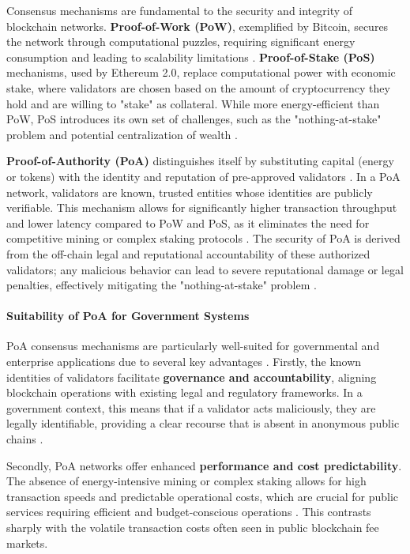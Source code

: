 Consensus mechanisms are fundamental to the security and integrity of blockchain networks. \textbf{Proof-of-Work (PoW)}, exemplified by Bitcoin, secures the network through computational puzzles, requiring significant energy consumption and leading to scalability limitations \cite{researchgate2020survey}. \textbf{Proof-of-Stake (PoS)} mechanisms, used by Ethereum 2.0, replace computational power with economic stake, where validators are chosen based on the amount of cryptocurrency they hold and are willing to "stake" as collateral. While more energy-efficient than PoW, PoS introduces its own set of challenges, such as the "nothing-at-stake" problem and potential centralization of wealth \cite{researchgate2020survey}.

\textbf{Proof-of-Authority (PoA)} distinguishes itself by substituting capital (energy or tokens) with the identity and reputation of pre-approved validators \cite{zebpay2026poa}. In a PoA network, validators are known, trusted entities whose identities are publicly verifiable. This mechanism allows for significantly higher transaction throughput and lower latency compared to PoW and PoS, as it eliminates the need for competitive mining or complex staking protocols \cite{echo2026poa}. The security of PoA is derived from the off-chain legal and reputational accountability of these authorized validators; any malicious behavior can lead to severe reputational damage or legal penalties, effectively mitigating the "nothing-at-stake" problem \cite{grokipedia2026poa}.

\paragraph{Suitability of PoA for Government Systems}

PoA consensus mechanisms are particularly well-suited for governmental and enterprise applications due to several key advantages \cite{onekey2026poa}. Firstly, the known identities of validators facilitate \textbf{governance and accountability}, aligning blockchain operations with existing legal and regulatory frameworks. In a government context, this means that if a validator acts maliciously, they are legally identifiable, providing a clear recourse that is absent in anonymous public chains \cite{hep2023governance}.

Secondly, PoA networks offer enhanced \textbf{performance and cost predictability}. The absence of energy-intensive mining or complex staking allows for high transaction speeds and predictable operational costs, which are crucial for public services requiring efficient and budget-conscious operations \cite{zebpay2026poa}. This contrasts sharply with the volatile transaction costs often seen in public blockchain fee markets.

